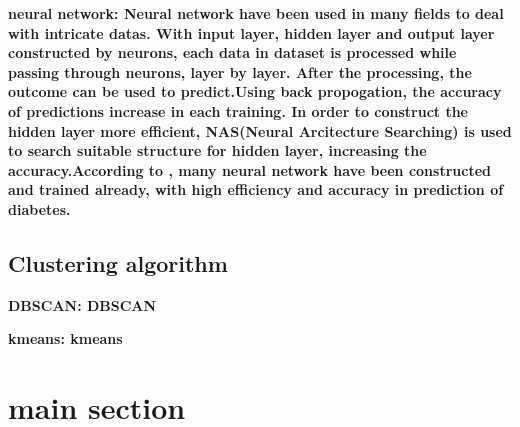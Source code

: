 \documentclass[twocolumn,10pt]{article}
\begin{document}
\bf{neural network}: \rm{Neural} network have been used in many fields to deal with intricate datas. With input layer, hidden 
layer and output layer constructed by neurons, each data in dataset is processed while passing through neurons, layer by layer. 
After the processing, the outcome can be used to predict.Using back propogation, the accuracy of predictions increase in each 
training. In order to construct the hidden layer more efficient, NAS(Neural Arcitecture Searching) is used to search suitable 
structure for hidden layer, increasing the accuracy.According to \cite{Gadekallu2020}\cite{Beghriche2021}, many neural network 
have been constructed and trained already, with high efficiency and accuracy in prediction of diabetes.

\subsection*{Clustering algorithm}

\bf{DBSCAN}: \rm{DBSCAN}

\bf{kmeans}: \rm{kmeans}

\section{main section}
\end{document}
